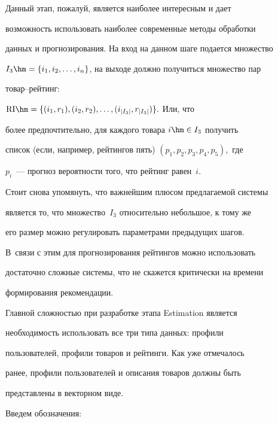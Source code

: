 Данный этап, пожалуй, является наиболее интересным и дает


возможность использовать наиболее современные методы обработки


данных и прогнозирования. На вход на данном шаге подается множество


$I_3\hm=\{\enum{i}{,}\}$, на выходе должно получиться множество пар


то\-вар--рей\-тинг:


$\mathrm{RI}\hm=\{(i_1,r_1),(i_2,r_2),\ldots,(i_{|I_3|},r_{|I_3|})\}.$ Или, что


более предпочтительно, для каждого товара $i \hm\in I_3$ получить


список (если, например, рейтингов пять) $(p_1,p_2,p_3,p_4,p_5),$ где


$p_i$~--- прогноз вероятности того, что рейтинг равен~$i.$





Стоит снова упомянуть, что важнейшим плюсом предлагаемой сис\-те\-мы


является то, что множество~$I_3$ относительно небольшое, к тому же


его размер можно регулировать параметрами предыдущих шагов. 


В~связи с этим для прогнозирования рейтингов можно использовать


достаточно сложные системы, что не скажется критически на времени


формирования рекомендации.





Главной сложностью при разработке этапа Estimation является


необходимость использовать все три типа данных: профили


пользователей, профили товаров и рейтинги. Как уже отмечалось


ранее, профили пользователей и описания товаров должны быть


представлены в векторном виде.





Введем обозначения:


